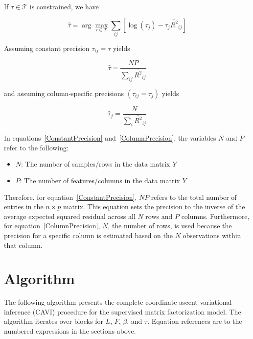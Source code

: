\documentclass{article}[12pt]
\begin{document}
If $\tau \in \mathcal{T}$ is constrained, we have

\begin{equation}
    \hat{\tau} = \arg\max_{\tau\in\mathcal{T}}\sum_{ij}\left[\log\left(\tau_{j}\right)-\tau_{j}\overline{R^2}_{ij}\right]
\end{equation}

Assuming constant precision $\tau_{ij} = \tau$ yields

\begin{equation}\label{ConstantPrecision}
    \hat{\tau} = \frac{N P}{\sum_{ij}\overline{R^2}_{ij}}
\end{equation}

and assuming column-specific precisions $\left(\tau_{ij} = \tau_j\right)$ yields

\begin{equation}\label{ColumnPrecision}
    \hat{\tau}_j = \frac{N}{\sum_{i}\overline{R^2}_{ij}}
\end{equation}

In equations~\ref{ConstantPrecision} and~\ref{ColumnPrecision}, the variables $N$ and $P$ refer to the following:
\begin{itemize}
    \item $N$: The number of samples/rows in the data matrix $Y$
    \item $P$: The number of features/columns in the data matrix $Y$
\end{itemize}

Therefore, for equation~\ref{ConstantPrecision}, $NP$ refers to the total number of entries in the $n \times p$ matrix. This equation sets the precision to the inverse of the average expected squared residual across all $N$ rows and $P$ columns. Furthermore, for equation~\ref{ColumnPrecision}, $N$, the number of rows, is used because the precision for a specific column is estimated based on the $N$ observations within that column.

\section{Algorithm}

The following algorithm presents the complete coordinate-ascent variational
inference (CAVI) procedure for the supervised matrix factorization model. The
algorithm iterates over blocks for $L$, $F$, $\beta$, and $\tau$. Equation
references are to the numbered expressions in the sections above.
\end{document}

